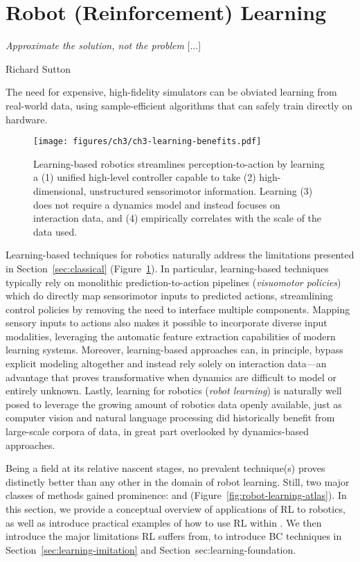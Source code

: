 \section{Robot (Reinforcement) Learning}
\label{sec:learning-rl}

\epigraph{\textit{Approximate the solution, not the problem} [...]}{Richard Sutton}

\begin{tldr}
The need for expensive, high-fidelity simulators can be obviated learning from real-world data, using sample-efficient algorithms that can safely train directly on hardware.
\end{tldr}

\begin{figure}
    \centering
    \texttt{[image: figures/ch3/ch3-learning-benefits.pdf]}
    \caption{Learning-based robotics streamlines perception-to-action by learning a (1) unified high-level controller capable to take (2) high-dimensional, unstructured sensorimotor information. Learning (3) does not require a dynamics model and instead focuses on interaction data, and (4) empirically correlates with
    the scale of the data used.
    }
    \label{fig:robot-learning-upsides}
\end{figure}

Learning-based techniques for robotics naturally address the limitations presented in Section~\ref{sec:classical} (Figure~\ref{fig:robot-learning-upsides}).
In particular, learning-based techniques typically rely on monolithic prediction-to-action pipelines (\emph{visuomotor policies}) which do directly map sensorimotor inputs to predicted actions, streamlining control policies by removing the need to interface multiple components.
Mapping sensory inputs to actions also makes it possible to incorporate diverse input modalities, leveraging the automatic feature extraction capabilities of modern learning systems. 
Moreover, learning-based approaches can, in principle, bypass explicit modeling altogether and instead rely solely on interaction data---an advantage that proves transformative when dynamics are difficult to model or entirely unknown.
Lastly, learning for robotics (\emph{robot learning}) is naturally well posed to leverage the growing amount of robotics data openly available, just as computer vision and natural language processing did historically benefit from large-scale corpora of data, in great part overlooked by dynamics-based approaches.

Being a field at its relative nascent stages, no prevalent technique(s) proves distinctly better than any other in the domain of robot learning.
Still, two major classes of methods gained prominence:  and  (Figure~\ref{fig:robot-learning-atlas}).
In this section, we provide a conceptual overview of applications of RL to robotics, as well as introduce practical examples of how to use RL within \lerobot.
We then introduce the major limitations RL suffers from, to introduce BC techniques in Section~\ref{sec:learning-imitation} and Section~{sec:learning-foundation}.

